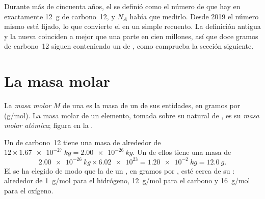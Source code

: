 \begin{remark}\label{rem:g10:the-mole:origin}
Durante más de cincuenta años, el  se definió como el número de
 que hay en exactamente \qty{12}{g} de carbono~12, y $N_A$ había
que medirlo. Desde 2019 el número mismo está fijado, lo que convierte el
 en un simple recuento. La definición antigua y la nueva coinciden a
mejor que una parte en cien millones, así que doce gramos de carbono~12
siguen conteniendo un  de , como comprueba la sección
siguiente.
\end{remark}

\section{La masa molar}

\begin{definition}\label{def:g10:the-mole:molar-mass}
La \emph{masa molar} $M$ de una  es la
masa de un  de sus entidades, en gramos por  (\si{g/mol}). La
masa molar de un elemento, tomada sobre su  natural de ,
es su \emph{masa molar atómica}; figura en la
.
\end{definition}

\begin{example}\label{ex:g10:the-mole:carbon}
Un  de carbono~12 tiene una masa de alrededor de
$12 \times \qty{1.67e-27}{kg} = \qty{2.00e-26}{kg}$. Un  de ellos
tiene una masa de
\[
  \qty{2.00e-26}{kg} \times \num{6.02e23} = \qty{1.20e-2}{kg}
  = \qty{12.0}{g}.
\]
El  se ha elegido de modo que la  de un , en gramos
por , esté cerca de su : alrededor de \qty{1}{g/mol}
para el hidrógeno, \qty{12}{g/mol} para el carbono y \qty{16}{g/mol}
para el oxígeno.
\end{example}

